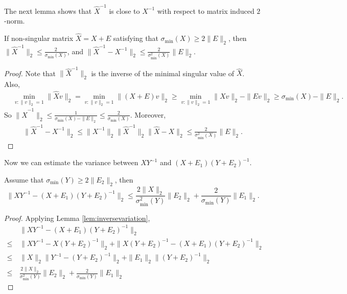 The next lemma shows that $\hat{X}^{-1}$ is close to $X^{-1}$ with respect to  matrix induced $2$-norm.
\begin{lemma}
	\label{lem:inversevariation}
	If non-singular matrix $\hat{X} = X+E$ satisfying that $\sigma_{\min}(X)\ge2\|E\|_2$, then $\|\hat{X}^{-1}\|_2 \le \frac{2}{\sigma_{\min}(X)}$, and $\|\hat{X}^{-1} - X^{-1} \|_2 \le \frac{2}{\sigma_{\min}^2(X)}\|E\|_2$.
\end{lemma} 
\begin{proof}
	Note that $\|\hat{X}^{-1}\|_2$ is the inverse of the minimal singular value of $\hat{X}$. Also, 
	\begin{align*}
	& \min_{v:\|v\|_2=1} \|\hat{X}v\|_2 = \min_{v:\|v\|_2=1}\|(X+E)v\|_2 \ge \min_{v:\|v\|_2=1} \|Xv\|_2 - \|Ev\|_2 \ge \sigma_{\min}(X) - \|E\|_2.
	\end{align*}
	So $\|\hat{X}^{-1}\|_2 \le \frac{1}{\sigma_{\min}(X) - \|E\|_2} \le \frac{2}{\sigma_{\min}(X)}$. Moreover,
	\begin{align*}
	\|\hat{X}^{-1} - X^{-1} \|_2 \le \|X^{-1}\|_2\|\hat{X}^{-1}\|_2\|\hat{X} - X\|_2
	\le \frac{2}{\sigma_{\min}^2(X)}\|E\|_2.
	\end{align*}
\end{proof}
Now we can estimate the variance between $XY^{-1}$ and $(X+E_1)(Y+E_2)^{-1}$.
\begin{lemma}
	\label{lem:Mvariation}
	Assume that $\sigma_{\min}(Y)\ge2\|E_2\|_2$, then
	\[
	\| XY^{-1} - (X+E_1)(Y+E_2)^{-1}\|_2 \le \frac{2\|X\|_2}{\sigma_{\min}^2(Y)}\|E_2\|_2 + \frac{2}{\sigma_{\min}(Y)}\|E_1\|_2.
	\]
\end{lemma}
\begin{proof}
	Applying Lemma \ref{lem:inversevariation},
	\begin{align*}
	& \| XY^{-1} - (X+E_1)(Y+E_2)^{-1}\|_2 \\
	\le\, & \| XY^{-1} - X(Y+E_2)^{-1}\|_2 + \| X(Y+E_2)^{-1} - (X+E_1)(Y+E_2)^{-1}\|_2 \\
	\le\, & \|X\|_2\| Y^{-1} - (Y+E_2)^{-1}\|_2 + \|E_1\|_2\|(Y+E_2)^{-1}\|_2\\
	\le\, & \frac{2\|X\|_2}{\sigma_{\min}^2(Y)}\|E_2\|_2 + \frac{2}{\sigma_{\min}(Y)}\|E_1\|_2
	\end{align*}
\end{proof}

